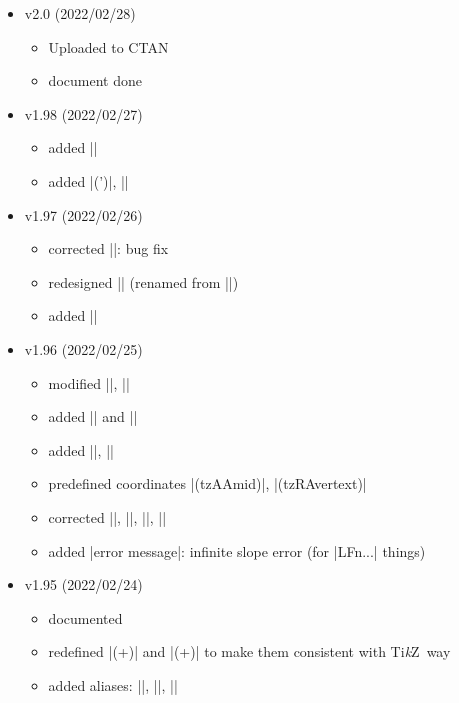 \documentclass[a4paper,amsmath,chapter]{oblivoir}
\newcommand*\Tikz{Ti\textit{k}Z}
\begin{document}
\begin{itemize}
\item v2.0 (2022/02/28)
  \begin{itemize}
  \item Uploaded to CTAN
  \item document done
  \end{itemize}
\item v1.98 (2022/02/27)
  \begin{itemize}
  \item added |\tzpointangle|
  \item added |\tzfnarealine(')|, |\settzfnarealinestyle|
  \end{itemize}
\item v1.97 (2022/02/26)
  \begin{itemize}
  \item corrected |\tzpdfN|: bug fix
  \item redesigned |\tzfnarea| (renamed from |\tzfnArea|)
  \item added |\settzfnarearlayer|
  \end{itemize}
\item v1.96 (2022/02/25)
  \begin{itemize}
  \item modified |\tzanglemark|, |\tzrightanglemark|
  \item added |\settzAAlinestyle| and |\settzRAlinestyle|
  \item added |\settzAAradius|, |\settzRAsize|
  \item predefined coordinates |(tzAAmid)|, |(tzRAvertext)|
  \item corrected |\tzdefLFn|, |\tzdefLFnofy|, |\tzLfn|, |\tzLFnofy|
  \item added |error message|: infinite slope error (for |LFn...| things)
  \end{itemize}
\item v1.95 (2022/02/24)
  \begin{itemize}
  \item documented
  \item redefined |\tzedge(+)| and |\tzedges(+)| to make them consistent with \Tikz\ way
  \item added aliases: |\tzbox|, |\tzboxring|, |\tzcirclering|

\end{itemize}
\end{itemize}
\end{document}
